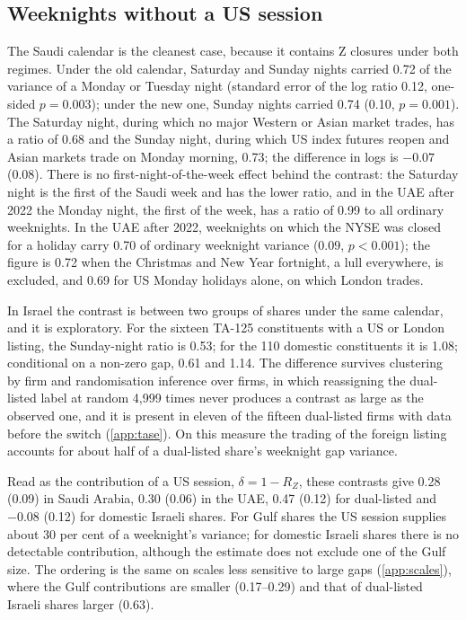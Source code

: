 \subsection{Weeknights without a US session}
The Saudi calendar is the cleanest case, because it contains Z closures under both regimes. Under the old calendar, Saturday and Sunday nights carried 0.72 of the variance of a Monday or Tuesday night (standard error of the log ratio 0.12, one-sided $p=0.003$); under the new one, Sunday nights carried 0.74 (0.10, $p=0.001$). The Saturday night, during which no major Western or Asian market trades, has a ratio of 0.68 and the Sunday night, during which US index futures reopen and Asian markets trade on Monday morning, 0.73; the difference in logs is $-0.07$ (0.08). There is no first-night-of-the-week effect behind the contrast: the Saturday night is the first of the Saudi week and has the lower ratio, and in the UAE after 2022 the Monday night, the first of the week, has a ratio of 0.99 to all ordinary weeknights. In the UAE after 2022, weeknights on which the NYSE was closed for a holiday carry 0.70 of ordinary weeknight variance (0.09, $p<0.001$); the figure is 0.72 when the Christmas and New Year fortnight, a lull everywhere, is excluded, and 0.69 for US Monday holidays alone, on which London trades.

In Israel the contrast is between two groups of shares under the same calendar, and it is exploratory. For the sixteen TA-125 constituents with a US or London listing, the Sunday-night ratio is 0.53; for the 110 domestic constituents it is 1.08; conditional on a non-zero gap, 0.61 and 1.14. The difference survives clustering by firm and randomisation inference over firms, in which reassigning the dual-listed label at random 4,999 times never produces a contrast as large as the observed one, and it is present in eleven of the fifteen dual-listed firms with data before the switch (\ref{app:tase}). On this measure the trading of the foreign listing accounts for about half of a dual-listed share's weeknight gap variance.

Read as the contribution of a US session, $\delta=1-R_Z$, these contrasts give 0.28 (0.09) in Saudi Arabia, 0.30 (0.06) in the UAE, 0.47 (0.12) for dual-listed and $-0.08$ (0.12) for domestic Israeli shares. For Gulf shares the US session supplies about 30 per cent of a weeknight's variance; for domestic Israeli shares there is no detectable contribution, although the estimate does not exclude one of the Gulf size. The ordering is the same on scales less sensitive to large gaps (\ref{app:scales}), where the Gulf contributions are smaller (0.17--0.29) and that of dual-listed Israeli shares larger (0.63).

